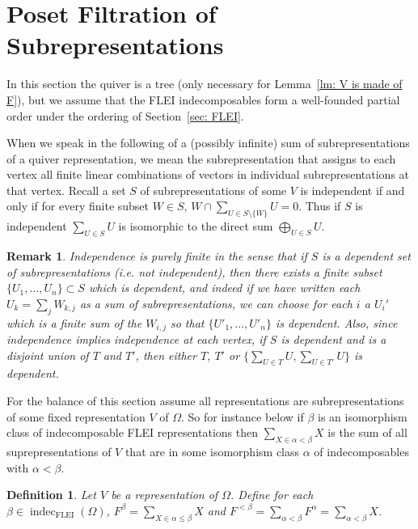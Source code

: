 \documentclass{article}
\newtheorem{definition}{Definition}
\newtheorem{remark}{Remark}[section]
\begin{document}

\section{Poset Filtration of Subrepresentations}
\label{sec: poset filtration of subrepresentations}
In this section the quiver is a tree (only necessary for  Lemma~\ref{lm: V is made of F}), but we assume that the FLEI indecomposables form a well-founded partial order under the ordering of Section~\ref{sec: FLEI}.

When we speak in the following of a (possibly infinite) sum of subrepresentations  of a quiver representation, we mean the subrepresentation that assigns to each vertex all finite linear combinations of vectors in individual subrepresentations at that vertex.  Recall a set $S$ of subrepresentations of some $V$  is independent if and only if for every finite subset $W \in S$, $W \cap \sum_{U \in S\setminus \{W\}} U = 0$. Thus if $S$ is independent $\sum_{U \in S} U$  is isomorphic to the direct sum $\bigoplus_{U \in S} U$.

\begin{remark}\label{rem: independence is finite}
 Independence is purely finite  in the  sense that if $S$ is a dependent set of subrepresentations (i.e. not independent), then there exists a finite subset $\{U_1, \ldots, U_n\} \subset S$ which is dependent, and indeed if we have written each $U_k= \sum_j W_{k,j}$ as a sum of subrepresentations,  we can choose for each $i$ a $U_i'$ which is a finite sum of the $W_{i,j}$ so that $\{U'_1, \ldots, U'_n\}$ is dependent. Also, since independence implies independence at each vertex, if $S$ is dependent and is a disjoint union of $T$ and $T'$, then either $T$, $T'$ or $\{\sum_{U \in T} U, \sum_{U \in T'} U\}$ is dependent.  
\end{remark}

  For the balance of this section assume all representations are subrepresentations of some fixed representation $V$ of $\Omega$.  So for instance below if $\beta$ is an isomorphism class of indecomposable FLEI representations then $\sum_{X \in \alpha<\beta } X$ is the sum of all suprepresentations of $V$ that are in some  isomorphism class $\alpha$ of indecomposables with $\alpha<\beta$.

\begin{definition}
    Let $V$ be a representation of $\Omega$. Define for each $\beta \in \operatorname{indec}_{\text{FLEI}}(\Omega)$, $F^\beta = \sum_{X \in \alpha \leq \beta} X$ and $F^{<\beta} = \sum_{\alpha < \beta} F^\alpha = \sum_{\alpha < \beta} X$. 
\end{definition}
\end{document}
